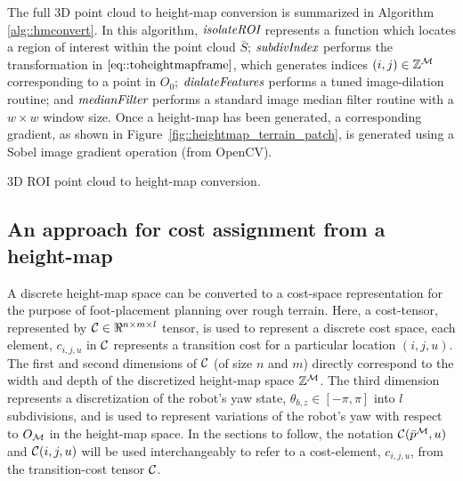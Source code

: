 			The full 3D point cloud to height-map conversion is summarized in Algorithm \ref{alg::hmconvert}. In this algorithm, $\emph{\text{isolateROI}}$ represents a function which locates a region of interest within the point cloud $\bar{S}$; $\emph{\text{subdivIndex}}$ performs the transformation in $\ref{eq::toheightmapframe}$, which generates indices $(i,j)\in{\Bbb Z}^{{\cal M}}$ corresponding to a point in $O_{0}$; $\emph{\text{dialateFeatures}}$ performs a tuned image-dilation routine; and $\emph{\text{medianFilter}}$ performs a standard image median filter routine with a $w\times w$ window size. Once a height-map has been generated, a corresponding gradient, as shown in Figure~\ref{fig::heightmap_terrain_patch}, is generated using a Sobel image gradient operation (from OpenCV).
			\begin{algorithm}[!h]
				\begin{algorithmic}
						\EndIf
					\EndFor
				\end{algorithmic}	
				\caption{3D ROI point cloud to height-map conversion.}
				\label{alg::hmconvert}
			\end{algorithm}






		\subsection{An approach for cost assignment from a height-map}

			A discrete height-map space can be converted to a cost-space representation for the purpose of foot-placement planning over rough terrain. Here, a cost-tensor, represented by ${\cal C}\in\Re^{n\times m\times l}$ tensor, is used to represent a discrete cost space, \IE each element, $c_{i,j,u}$ in ${\cal C}$ represents a transition cost for a particular location $(i,j,u)$. The first and second dimensions of ${\cal C}$ (of size $n$ and $m$) directly correspond to the width and depth of the discretized height-map space $\mathbb{Z}^{{\cal M}}$. The third dimension represents a discretization of the robot's yaw state, $\theta_{b,z}\in[-\pi,\pi]$ into $l$ subdivisions, and is used to represent variations of the robot's yaw with respect to $O_{{\cal M}}$ in the height-map space.  In the sections to follow, the notation ${\cal C}(\bar{p}^{{\cal M}},u)$ and ${\cal C}(i,j,u)$ will be used interchangeably to refer to a cost-element, $c_{i,j,u}$, from the transition-cost tensor ${\cal C}$.


